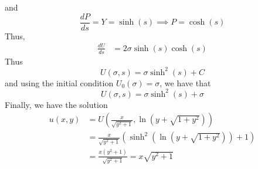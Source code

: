 \documentclass[11pt]{article}
\theoremstyle{mystyle}
\theoremstyle{definition}
\begin{document}
and 
\[
  \displaystyle\frac{dP}{ds} = Y = \sinh(s) \implies P = \cosh(s)
\]
Thus,  
\begin{align*}
  \displaystyle\frac{dU}{ds} &= 2 \sigma \sinh(s) \cosh(s) 
\end{align*}
Thus 
\[
  U(\sigma, s) =  \sigma \sinh^2(s) + C
\]
and using the initial condition $U_0(\sigma) = \sigma$, we have that 
\[
  U(\sigma, s) = \sigma \sinh^2(s) + \sigma 
\]
Finally, we have the solution 
\begin{align*}
  u(x,y) &= U\left(\displaystyle\frac{x}{\sqrt{y^2+1}}, \ln(y + \sqrt{1+y^2})\right) \\
  &= \displaystyle\frac{x}{\sqrt{y^2+1}} \left(\sinh^2(\ln(y + \sqrt{1+y^2})) + 1\right) \\
  &= \displaystyle\frac{x(y^2+1) }{\sqrt{y^2+1}} = x \sqrt{y^2+1}
\end{align*}
\end{document}
